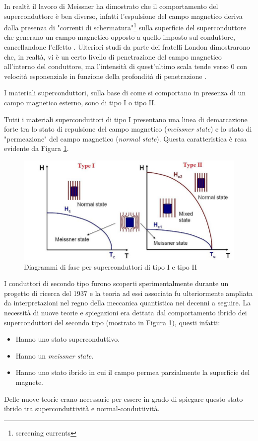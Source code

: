 \documentclass[a4paper,10pt]{article}
\begin{document}
In realtà il lavoro di Meissner ha dimostrato che il comportamento del superconduttore è ben
diverso, infatti l'espulsione del campo magnetico deriva dalla presenza di "correnti di
schermatura"\footnote{screening currents} sulla superficie del superconduttore che generano un
campo magnetico opposto a quello imposto sul conduttore, cancellandone
l'effetto \cite{super-fundamentals}. Ulteriori studi da parte dei fratelli London dimostrarono che,
in realtà, vi è un certo livello di penetrazione del campo magnetico all'interno del conduttore, ma
l'intensità di quest'ultimo scala tende verso $0$ con velocità esponenziale in funzione della profondità di penetrazione \cite{ssp}.

\bigskip
\noindent
I materiali superconduttori, sulla base di come si comportano in presenza di un campo magnetico
esterno, sono di tipo I o tipo II.

Tutti i materiali superconduttori di tipo I presentano una linea di demarcazione forte tra lo stato
di repulsione del campo magnetico (\emph{meissner state}) e lo stato di "permeazione" del campo
magnetico (\emph{normal state}). Questa caratteristica è resa evidente da Figura \ref{fig:phase-diagram}.
\begin{figure}[h!]
	\centering

	\includegraphics[scale=0.35]{fig/phase-diagram.jpg}
	\caption{
		Diagrammi di fase per superconduttori di tipo I e tipo
		II\cite{super-types}
	}\label{fig:phase-diagram}
\end{figure}

I conduttori di secondo tipo furono scoperti sperimentalmente durante un progetto di ricerca del 1937 \cite{type-2} e la teoria ad essi associata fu ulteriormente ampliata da interpretazioni nel regno della meccanica quantistica nei decenni a seguire. La necessità di nuove teorie e spiegazioni era dettata dal comportamento ibrido dei superconduttori del secondo tipo (mostrato in Figura \ref{fig:phase-diagram}), questi infatti:
\begin{itemize}
	\item Hanno uno stato superconduttivo.
	\item Hanno un \emph{meissner state}.
	\item Hanno uno stato ibrido in cui il campo permea parzialmente la superficie del magnete.
\end{itemize}
Delle nuove teorie erano necessarie per essere in grado di spiegare questo stato ibrido tra superconduttività e normal-conduttività.
\end{document}
